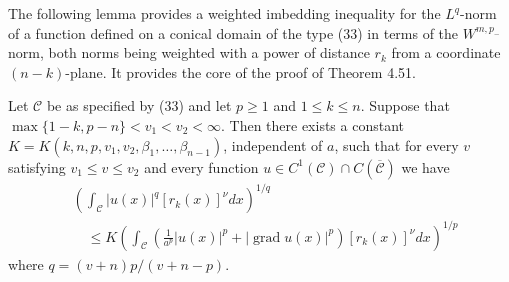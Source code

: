 The following lemma provides a weighted imbedding inequality for the $L^q$-norm of a function defined on a conical domain of the type (33) in terms of the $W^{m, p_{-}}$ norm, both norms being weighted with a power of distance $r_k$ from a coordinate $(n-k)$-plane. It provides the core of the proof of Theorem 4.51.


\begin{lemma}
  Let $\mathcal{C}$ be as specified by (33) and let $p \geq 1$ and $1 \leq k \leq n$. Suppose that $\max \{1-k, p-n\}<v_1<v_2<\infty$. Then there exists a constant
  $K=K\left(k, n, p, v_1, v_2, \beta_1, \ldots, \beta_{n-1}\right)$, independent of $a$, such that for every $v$ satisfying $v_1 \leq v \leq v_2$ and every function $u \in C^1(\mathcal{C}) \cap C(\overline{\mathcal{C}})$ we have
  \[
  \begin{aligned}
  & \left(\int_{\mathcal{C}}|u(x)|^q\left[r_k(x)\right]^\nu d x\right)^{1 / q} \\
  & \quad \leq K\left(\int_{\mathcal{C}}\left(\frac{1}{a^p}|u(x)|^p+|\operatorname{grad} u(x)|^p\right)\left[r_k(x)\right]^\nu d x\right)^{1 / p}
  \end{aligned}
  \]
  where $q=(v+n) p /(v+n-p)$.
\end{lemma}

